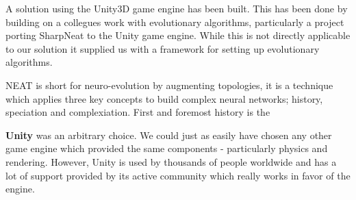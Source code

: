 A solution using the Unity3D\cite{web:unity} game engine has been built. This has been done by building on a collegues work\cite{web:unityneat} with evolutionary algorithms, particularly a project porting SharpNeat\cite{web:sharpneat} to the Unity game engine.
While this is not directly applicable to our solution it supplied us with a framework for setting up evolutionary algorithms.

NEAT is short for neuro-evolution by augmenting topologies, it is a technique which applies three key concepts to build complex neural networks; history, speciation and complexiation. First and foremost history is the 
    
\textbf{Unity} was an arbitrary choice. We could just as easily have chosen any other game engine which provided the same components - particularly physics and rendering. However, Unity is used by thousands of people worldwide and has a lot of support provided by its active community which really works in favor of the engine.


